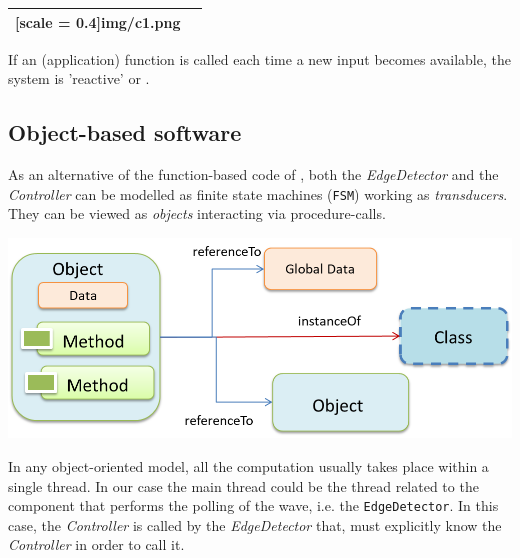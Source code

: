 \documentclass[10pt,a4paper,openright,twoside]{C:/Didattica/git/lab2014Bo/it.unibo.iss2015intro/docsInternal/contents/llncs}
\newcommand{\code}[1]{{\color{blue}{\texttt{#1}}}}
\begin{document}
\begin{tabular}{|c|c|}
[scale = 0.4]{img/c1.png}\\
\hline 
\end{tabular}

If an (application) function is called each time a new input becomes available, the system is 'reactive' or \code{event-driven}.



\subsection{Object-based software}
As an alternative of the function-based code of , both the \textit{EdgeDetector} and the \textit{Controller} can be modelled as finite state machines (\texttt{FSM}) working as \textit{transducers}. 
They can be viewed as \textit{objects} interacting via procedure-calls.


\includegraphics[scale = 0.4]{img/c2.png}

In any object-oriented model, all the computation usually takes place within a single thread. In our case the main thread could be the thread related to the component that performs the polling of the wave, i.e. the  \texttt{EdgeDetector}.  In this case, the \textit{Controller} is called by the \textit{EdgeDetector} that, must explicitly know the \textit{Controller} in order to call it. 
\end{document}
